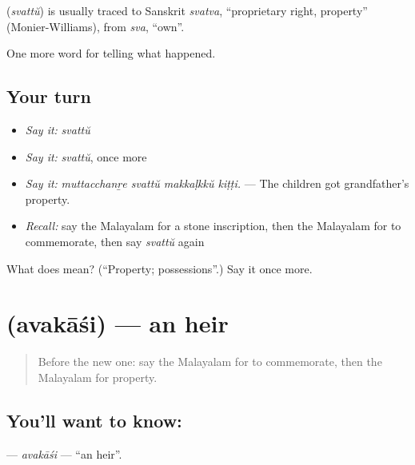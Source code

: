 \begin{cousinweb}
\textbf{} (\emph{svattŭ}) is usually traced to Sanskrit \emph{svatva}, \textquotedblleft{}proprietary right, property\textquotedblright{} (Monier-Williams), from \emph{sva}, \textquotedblleft{}own\textquotedblright{}.
\end{cousinweb}

\begin{grammarlens}[title={What you've built}]
One more word for telling what happened.
\end{grammarlens}

\subsection*{Your turn}
\begin{itemize}
\raggedright
  \item \emph{Say it:} \emph{svattŭ}
  \item \emph{Say it:} \emph{svattŭ}, once more
  \item \emph{Say it:} \emph{muttacchanṟe svattŭ makkaḷkkŭ kiṭṭi.} — The children got grandfather's property.
  \item \emph{Recall:} say the Malayalam for a stone inscription, then the Malayalam for to commemorate, then say \emph{svattŭ} again
\end{itemize}

\begin{tcolorbox}[breakable,colback=teal!4,colframe=teal!35!black,title={Before you move on}]
What does  mean? (\textquotedblleft{}Property; possessions\textquotedblright{}.) Say it once more.
\end{tcolorbox}
\section[\texorpdfstring{\ml{അവകാശി} (avakāśi)}{അവകാശി (avakāśi)}]{ (avakāśi) — an heir}

\label{lesson:ML-C394-avakasi}



\begin{quote}
Before the new one: say the Malayalam for to commemorate, then the Malayalam for property.
\end{quote}

\subsection*{You'll want to know: }
\textbf{} — \emph{avakāśi} — \textquotedblleft{}an heir\textquotedblright{}.

